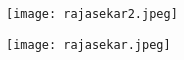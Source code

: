 \documentclass{standalone}
\begin{document}
\texttt{[image: rajasekar2.jpeg]}

\texttt{[image: rajasekar.jpeg]}
\end{document}
